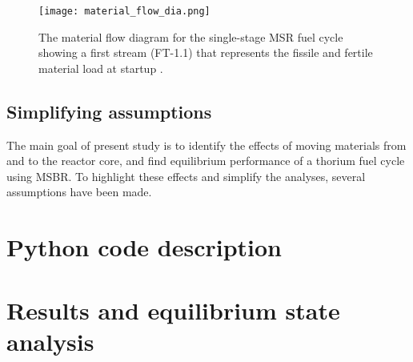 \begin{figure}[htp!] %
  \centering
  \vspace{-0.3em}
  \texttt{[image: material\_flow\_dia.png]}
  \caption{The material flow diagram for the single-stage \gls{MSR} fuel cycle showing a first stream (FT-1.1) that represents the fissile and fertile material load at startup \cite{wigeland_nuclear_2014}.}
  \vspace{-0.6em}
  \label{fig:material_flow}
\end{figure}
\FloatBarrier

\subsection{Simplifying assumptions}
The main goal of present study is to identify the effects of moving materials from and to the reactor core, and find equilibrium performance of a thorium fuel cycle using \gls{MSBR}. To highlight these effects and simplify the analyses, several assumptions have been made.

\section{Python code description}

\section{Results and equilibrium state analysis}